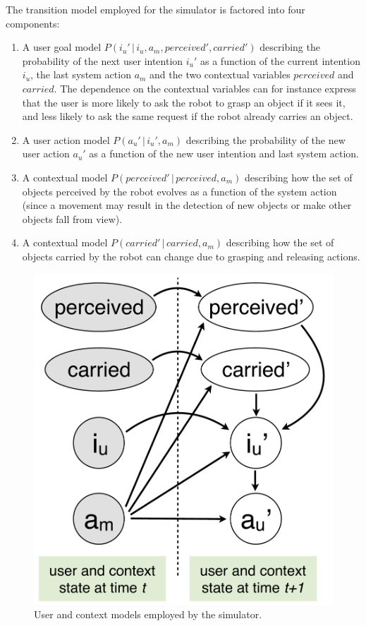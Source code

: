 The transition model employed for the simulator is factored into four components:
\begin{enumerate}
\item A user goal model $P(i_u' \, | \, i_u, a_m, \mathit{perceived}', \mathit{carried}')$ describing the probability of the next user intention $i_u'$ as a function of the current intention $i_u$, the last system action $a_m$ and the two contextual variables $\mathit{perceived}$ and $\mathit{carried}$.  The dependence on the contextual variables can for instance express that the user is more likely to ask the robot to grasp an object if it sees it, and less likely to ask the same request if the robot already carries an object.
\item A user action model $P(a_u' \, | \, i_u', a_m)$ describing the probability of the new user action $a_u'$ as a function of the new user intention and last system action.
\item A contextual model $P(\mathit{perceived}' \, | \, \mathit{perceived}, a_m)$ describing how the set of objects perceived by the robot evolves as a function of the system action (since a movement may result in the detection of new objects or make other objects fall from view).
\item A contextual model $P(\mathit{carried}' \, | \, \mathit{carried}, a_m)$ describing how the set of objects carried by the robot can change due to grasping and releasing actions. 
\end{enumerate}

\begin{figure}
\vspace{-2mm}
\centering
\includegraphics[scale=0.25]{imgs/simulatormodels.pdf}
\caption{User and context models employed by the simulator.}
\label{fig:simulatormodels}
\end{figure}

